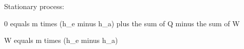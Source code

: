 Stationary process:

0 equals m times (h_e minus h_a) plus the sum of Q minus the sum of W

W equals m times (h_e minus h_a)